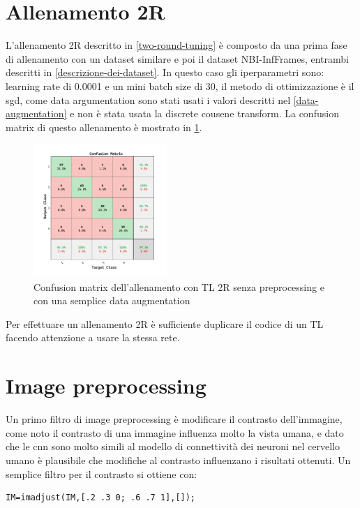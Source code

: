 \section{Allenamento 2R}\label{allenamento-2r}

L'allenamento 2R descritto in \cref{two-round-tuning} è composto da una prima fase di allenamento con un dataset similare e poi il dataset NBI-InfFrames, entrambi descritti in  \cref{descrizione-dei-dataset}. In questo caso gli iperparametri sono:   learning rate di 0.0001 e un mini batch size di 30, il metodo di ottimizzazione è il \gls{sgd}, come data argumentation sono stati usati i valori descritti nel \cref{data-augmentation} e non è stata usata la discrete cousene transform. La confusion matrix di questo allenamento è mostrato in \cref{fig:two-liscio}.


\begin{figure}[ht]
    \centering
    \includegraphics[width=0.45\textwidth]{addestramento-rete-neurale/two-liscio.pdf}
    \caption{Confusion matrix dell'allenamento con TL 2R senza preprocessing e con una semplice data augmentation}
    \label{fig:two-liscio}
\end{figure}

Per effettuare un allenamento 2R è sufficiente duplicare il codice di un TL facendo attenzione a usare la stessa rete.

\section{Image preprocessing}\label{image-preprocessing}

Un primo filtro di image preprocessing è modificare il contrasto dell'immagine, come noto il contrasto di una immagine influenza molto la vista umana, e dato che le \gls{cnn} sono molto simili al modello di connettività dei neuroni nel cervello umano è plausibile che modifiche al contrasto influenzano i risultati  ottenuti. Un semplice filtro per il contrasto si ottiene con:
\begin{lstlisting}
IM=imadjust(IM,[.2 .3 0; .6 .7 1],[]);    
\end{lstlisting}

